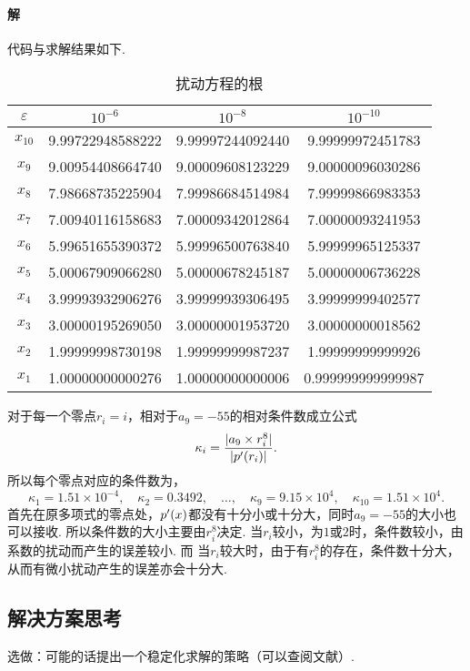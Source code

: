   \paragraph{解}
    代码与求解结果如下.
    
    \begin{table}[htbp]
      \centering
      \caption{扰动方程的根}
      \begin{tabular}{c|ccc}
        \toprule
        $\varepsilon$ & $10^{-6}$ & $10^{-8}$ & $10^{-10}$ \\
        \midrule
        $x_{10}$ & 9.99722948588222 & 9.99997244092440 & 9.99999972451783  \\
        $x_9$ & 9.00954408664740 & 9.00009608123229 & 9.00000096030286  \\
        $x_8$ & 7.98668735225904 & 7.99986684514984 & 7.99999866983353  \\
        $x_7$ & 7.00940116158683 & 7.00009342012864 & 7.00000093241953  \\
        $x_6$ & 5.99651655390372 & 5.99996500763840 & 5.99999965125337  \\
        $x_5$ & 5.00067909066280 & 5.00000678245187 & 5.00000006736228  \\
        $x_4$ & 3.99993932906276 & 3.99999939306495 & 3.99999999402577  \\
        $x_3$ & 3.00000195269050 & 3.00000001953720 & 3.00000000018562  \\
        $x_2$ & 1.99999998730198 & 1.99999999987237 & 1.99999999999926  \\
        $x_1$ & 1.00000000000276 & 1.00000000000006 & 0.999999999999987 \\
        \bottomrule
      \end{tabular}
    \end{table}
    对于每一个零点$r_i = i$，相对于$a_9 = -55$的相对条件数成立公式
    \[
      \kappa_i = \frac{|a_9\times r_i^8|}{|p^{\prime}(r_i)|}.
    \]
    所以每个零点对应的条件数为，
    \[
      \kappa_1 = 1.51\times 10^{-4},\quad
      \kappa_2 = 0.3492,\quad\dots,\quad
      \kappa_9 = 9.15\times 10^4,\quad
      \kappa_{10} = 1.51\times 10^4.
    \]
    首先在原多项式的零点处，$p^{\prime}(x)$都没有十分小或十分大，同时$a_9=-55$的大小也可以接收.
    所以条件数的大小主要由$r_i^8$决定.
    当$r_i$较小，为$1$或$2$时，条件数较小，由系数的扰动而产生的误差较小. 而
    当$r_i$较大时，由于有$r_i^8$的存在，条件数十分大，从而有微小扰动产生的误差亦会十分大.

\subsection{解决方案思考}
  选做：可能的话提出一个稳定化求解的策略（可以查阅文献）.
